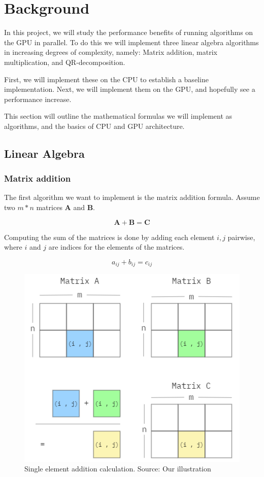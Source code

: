 \section{Background} \label{sect:backgroundw}

In this project, we will study the performance benefits of running algorithms on the GPU in parallel. To do this we will implement three linear algebra algorithms in increasing degrees of complexity, namely: Matrix addition, matrix multiplication, and QR-decomposition.

First, we will implement these on the CPU to establish a baseline implementation. Next, we will implement them on the GPU, and hopefully see a performance increase.

This section will outline the mathematical formulas we will implement as algorithms, and the basics of CPU and GPU architecture.

\subsection{Linear Algebra}

\subsubsection{Matrix addition}

The first algorithm we want to implement is the matrix addition formula. Assume two \(m * n\) matrices \(\mathbf{A}\) and \(\mathbf{B}\). 

\[\mathbf{A} + \mathbf{B} = \mathbf{C}\]

Computing the sum of the matrices is done by adding each element \(i,j\) pairwise, where \(i\) and \(j\) are indices for the elements of the matrices.

\[a_{ij} + b_{ij} = c_{ij}\]

\begin{figure}[H]
\includegraphics[scale=.65]{Documents/Report/Figures/MatrixAddition.png}
\centering
\caption{Single element addition calculation. Source: Our illustration}
\label{fig:addition_illustration}
\end{figure}

